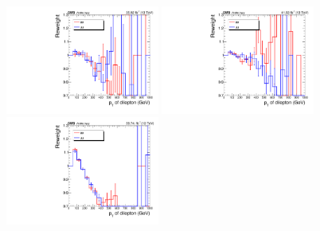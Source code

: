 \begin{figure}[htbp]
  \centering

  \includegraphics[width=0.45\textwidth]{figures/2016/Reweight.pdf}
  \hspace{0.01\textwidth}

  \includegraphics[width=0.45\textwidth]{figures/2017/Reweight.pdf}
  \hspace{0.01\textwidth}

  \includegraphics[width=0.45\textwidth]{figures/2018/Reweight.pdf}

  \label{fig:BkgdZptReweight}
\end{figure}

